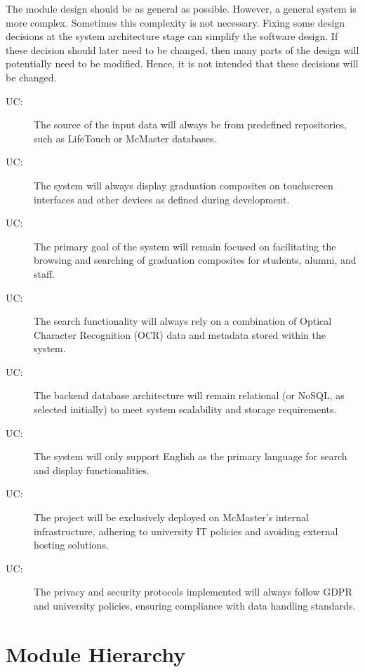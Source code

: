 \documentclass[12pt, titlepage]{article}
\newcounter{ucnum}
\newcommand{\uctheucnum}{UC\theucnum}
\begin{document}
The module design should be as general as possible. However, a general system is
more complex. Sometimes this complexity is not necessary. Fixing some design
decisions at the system architecture stage can simplify the software design. If
these decision should later need to be changed, then many parts of the design
will potentially need to be modified. Hence, it is not intended that these
decisions will be changed.

\begin{description}
\item[ \uctheucnum \label{ucIO}:] The source of the input data will always be from predefined repositories, such as LifeTouch or McMaster databases.
\item[ \uctheucnum \label{ucIO}:] The system will always display graduation composites on touchscreen interfaces and other devices as defined during development.
  \item[ \uctheucnum \label{ucIO}:] The primary goal of the system will remain focused on facilitating the browsing and searching of graduation composites for students, alumni, and staff.
  \item[ \uctheucnum \label{ucIO}:] The search functionality will always rely on a combination of Optical Character Recognition (OCR) data and metadata stored within the system.
  \item[ \uctheucnum \label{ucIO}:] The backend database architecture will remain relational (or NoSQL, as selected initially) to meet system scalability and storage requirements.
  \item[ \uctheucnum \label{ucIO}:] The system will only support English as the primary language for search and display functionalities.
  \item[ \uctheucnum \label{ucIO}:] The project will be exclusively deployed on McMaster’s internal infrastructure, adhering to university IT policies and avoiding external hosting solutions.
  \item[ \uctheucnum \label{ucIO}:] The privacy and security protocols implemented will always follow GDPR and university policies, ensuring compliance with data handling standards.
\end{description}

\section{Module Hierarchy} \label{SecMH}
\end{document}
